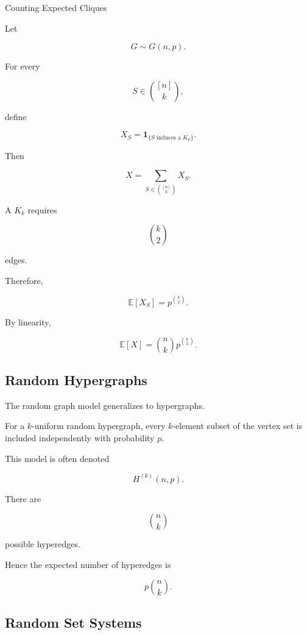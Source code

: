 \begin{workedexamplebox}{Counting Expected Cliques}

Let

\[
G\sim G(n,p).
\]

For every

\[
S\in\binom{[n]}k,
\]

define

\[
X_S
=
\mathbf{1}_{\{S\text{ induces a }K_k\}}.
\]

Then

\[
X
=
\sum_{S\in\binom{[n]}k}X_S.
\]

A \(K_k\) requires

\[
\binom{k}{2}
\]

edges.

Therefore,

\[
\mathbb{E}[X_S]
=
p^{\binom{k}{2}}.
\]

By linearity,

\begin{answerbox}
\[
\boxed{
\mathbb{E}[X]
=
\binom nk
p^{\binom{k}{2}}.
}
\]
\end{answerbox}

\end{workedexamplebox}

\subsection{Random Hypergraphs}
\label{subsec:random-hypergraphs}

The random graph model generalizes to hypergraphs.

For a \(k\)-uniform random hypergraph, every \(k\)-element subset of the
vertex set is included independently with probability \(p\).

This model is often denoted

\[
\boxed{
H^{(k)}(n,p).
}
\]

There are

\[
\binom nk
\]

possible hyperedges.

Hence the expected number of hyperedges is

\[
\boxed{
p\binom nk.
}
\]

\subsection{Random Set Systems}
\label{subsec:random-set-systems}

